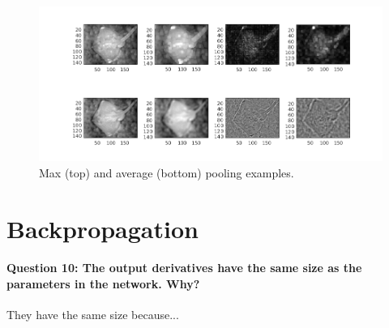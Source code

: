 \documentclass[12pt]{article}
\begin{document}
\begin{figure}[htbp]
 \centering
 \includegraphics[width=\textwidth]{max}
 \caption{Max (top) and average (bottom) pooling examples.}
 \label{fig:max}
\end{figure}

\section{Backpropagation}
\paragraph{Question 10: The output derivatives have the same size as the parameters in the network. Why?} They have the same size because...
\end{document}
